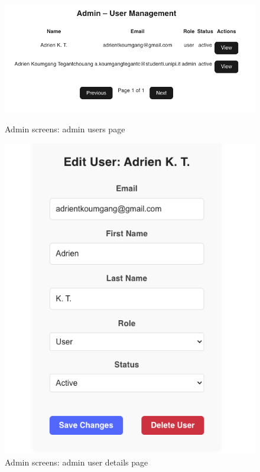 \begin{figure}[!h]
    \centering
    \begin{minipage}{0.48\linewidth}
        \centering
        \includegraphics[width=1\textwidth]{chapters/chapter_03/page/admin/admin-users-page}
        \caption{Admin screens: admin users page}
        \label{fig:admin-users-wireframes}
    \end{minipage}
    \hfil
    \begin{minipage}{0.48\linewidth}
        \centering
        \includegraphics[width=1\textwidth]{chapters/chapter_03/page/admin/admin-user-details-page}
        \caption{Admin screens: admin user details page}
        \label{fig:admin-user-details-wireframes}
    \end{minipage}
\end{figure}


